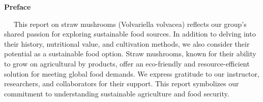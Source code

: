 \begin{center}
    \huge\bfseries{Preface}
\end{center}

\vspace{1cm}
{\fontsize{16pt}{16pt}\normalfont $\quad$ This report on straw mushrooms (Volvariella volvacea) reflects our group's shared passion for exploring sustainable food sources. In addition to delving into their history, nutritional value, and cultivation methods, we also consider their potential as a sustainable food option. Straw mushrooms, known for their ability to grow on agricultural by products, offer an eco-friendly and resource-efficient solution for meeting global food demands.
\medbreak
We express gratitude to our instructor, researchers, and collaborators for their support. This report symbolizes our commitment to understanding sustainable agriculture and food security.}\par